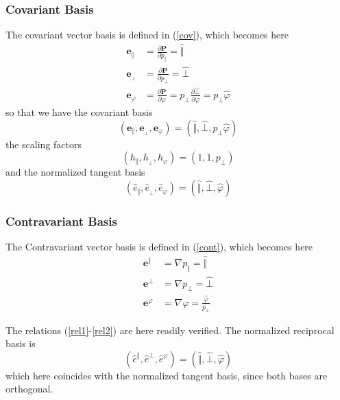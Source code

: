 \subsubsection{Covariant Basis}

The covariant vector basis is defined in (\ref{cov}), which becomes here 
\begin{align}
\mathbf{e}_{\Vert} & =\frac{\partial\mathbf{P}}{\partial p_{\Vert}}=\widehat{
\Vert} \\
\mathbf{e}_{_{\bot}} & =\frac{\partial\mathbf{P}}{\partial p_{\bot}}=%
\widehat{ \bot} \\
\mathbf{e}_{\varphi} & =\frac{\partial\mathbf{P}}{\partial\varphi}=p_{\bot }%
\frac{\partial\widehat{\bot}}{\partial\varphi}=p_{\bot}\widehat{\varphi}
\end{align}
so that we have the covariant basis 
\begin{equation}
\left( \mathbf{e}_{\Vert},\mathbf{e}_{_{\bot}},\mathbf{e}_{\varphi}\right)
=\left( \widehat{\Vert},\widehat{\bot},p_{\bot}\widehat{\varphi}\right)
\end{equation}
the scaling factors 
\begin{equation}
\left( h_{\Vert},h_{_{\bot}},h_{\varphi}\right) =\left( 1,1,p_{\bot }\right)
\end{equation}
and the normalized tangent basis 
\begin{equation}
\left( \widehat{e}_{\Vert},\widehat{e}_{_{\bot}},\widehat{e}_{\varphi
}\right) =\left( \widehat{\Vert},\widehat{\bot},\widehat{\varphi}\right)
\end{equation}

\subsubsection{Contravariant Basis}

The Contravariant vector basis is defined in (\ref{cont}), which becomes
here 
\begin{align}
\mathbf{e}^{\Vert} & =\nabla p_{\Vert}=\widehat{\Vert} \\
\mathbf{e}^{\bot} & =\nabla p_{\bot}=\widehat{\bot} \\
\mathbf{e}^{\varphi} & =\nabla\varphi=\frac{\widehat{\varphi}}{p_{\bot}}
\end{align}

The relations (\ref{rel1}-\ref{rel2}) are here readily verified. The
normalized reciprocal basis is 
\begin{equation}
\left( \widehat{e}^{\Vert},\widehat{e}^{\bot},\widehat{e}^{\varphi}\right)
=\left( \widehat{\Vert},\widehat{\bot},\widehat{\varphi}\right)
\end{equation}
which here coincides with the normalized tangent basis, since both bases are
orthogonal.

